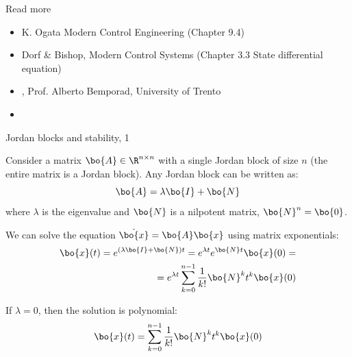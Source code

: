 \documentclass{beamer}
\begin{document}
\begin{frame}{Read more}

\begin{itemize}
	
	\item K. Ogata Modern Control Engineering (Chapter 9.4)
	
	\item Dorf \& Bishop, Modern Control Systems (Chapter 3.3 State differential equation)		
	
\item  {}, Prof. Alberto Bemporad, University of Trento

\item {}

\end{itemize}

\end{frame}



\myqrframe




\begin{frame}{Jordan blocks and stability, 1}
	\begin{flushleft}
		
		Consider a matrix $\bo{A} \in \R^{n \times n}$ with a single Jordan block of size $n$ (the entire matrix is a Jordan block). Any Jordan block can be written as:
		\begin{equation}
			\bo{A} = \lambda \bo{I} +\bo{N} 
		\end{equation}
		where $\lambda$ is the eigenvalue and $\bo{N} $ is a nilpotent matrix, $\bo{N}^n = \bo{0}$.
		
		\bigskip
		
		We can solve the equation $\dot{\bo{x}} = \bo{A}\bo{x}$ using matrix exponentials:
		\begin{align}
			\bo{x} (t)= e^{(\lambda \bo{I} +\bo{N})t  }= e^{\lambda t} e^{\bo{N}t} \bo{x} (0)=
			\\
			=  e^{\lambda t} \sum_{k=0}^{n-1} \frac{1}{k!} \bo{N}^k t^k \bo{x} (0)
		\end{align}
		
		If $\lambda = 0$, then the solution is polynomial:
		\begin{align}
			\bo{x} (t)=  \sum_{k=0}^{n-1} \frac{1}{k!} \bo{N}^k t^k \bo{x} (0)
		\end{align}
		 
		
		
	\end{flushleft}
\end{frame}
\end{document}
